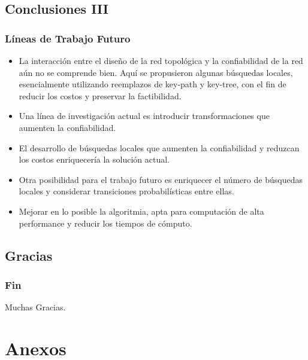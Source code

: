 \subsection{Conclusiones III}
\begin{frame} \frametitle{Líneas de Trabajo Futuro}
\begin{block} {}
   	\begin{scriptsize}
 	 \begin{itemize}
 	 	\item La interacción entre el diseño de la red topológica y la confiabilidad de la red aún no se comprende bien. Aquí se propusieron algunas búsquedas locales, esencialmente utilizando reemplazos de key-path y key-tree, con el fin de reducir los costos y preservar la factibilidad.
 	 	\item Una línea de investigación actual es introducir transformaciones que aumenten la confiabilidad. 
 	 	\item El desarrollo de búsquedas locales que aumenten la confiabilidad y reduzcan los costos enriquecería la solución actual.
 	 	\item Otra posibilidad para el trabajo futuro es enriquecer el número de búsquedas locales y considerar transiciones probabilísticas entre ellas.
 	 	\item Mejorar en lo posible la algoritmia, apta para computación de alta performance y reducir los tiempos de cómputo.
 	 \end{itemize}  
 	\end{scriptsize}
 \end{block} 	   
\end{frame}

\subsection{Gracias}
\begin{frame} \frametitle{Fin}
\begin{huge}
\begin{center}Muchas Gracias.\end{center}
\end{huge}
\end{frame}

\section{Anexos}
